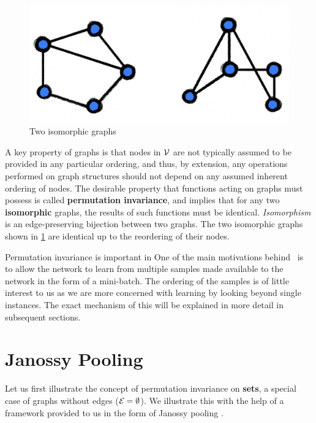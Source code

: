 \begin{figure}
    \centering
    \includegraphics[scale=0.15]{chapters/assets/graph-figs/mn_isomorphic.png}
    \caption{Two isomorphic graphs}
    \label{fig:graph-isomorphism}
\end{figure}
A key property of graphs is that nodes in $\mathcal{V}$ are not typically assumed to be provided in any particular ordering, and thus, by extension, any operations performed on graph structures should not depend on any assumed inherent ordering of nodes. The desirable property that functions acting on graphs must possess is called \textbf{permutation invariance}, and implies that for any two \textbf{isomorphic} graphs, the results of such functions must be identical. {\em Isomorphism} is an edge-preserving bijection between two graphs. The two isomorphic graphs shown in \cref{fig:graph-isomorphism} are identical up to the reordering of their nodes.

Permutation invariance is important in  One of the main motivations behind \samptr\ is to allow the network to learn from multiple samples made available to the network in the form of a mini-batch. The ordering of the samples is of little interest to us as we are more concerned with learning by looking beyond single instances. The exact mechanism of this will be explained in more detail in subsequent sections.



\section{Janossy Pooling}\label{sec:janossy-pooling}
Let us first illustrate the concept of permutation invariance on \textbf{sets}, a special case of graphs without edges ($\mathcal{E}=\emptyset$). We illustrate this with the help of a framework provided to us in the form of Janossy pooling \parencite{Murphy2018}.

